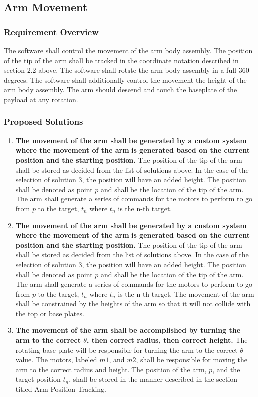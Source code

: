 \documentclass[letterpaper,10pt]{article}
\begin{document}
\subsection{Arm Movement}
\subsubsection{Requirement Overview}
The software shall control the movement of the arm body assembly. 
The position of the tip of the arm shall be tracked in the coordinate notation described in section 2.2 above.
The software shall rotate the arm body assembly in a full 360 degrees.
The software shall additionally control the movement the height of the arm body assembly.
The arm should descend and touch the baseplate of the payload at any rotation.
\subsubsection{Proposed Solutions}
\begin{enumerate}
\item{
\textbf{The movement of the arm shall be generated by a custom system where the movement of the arm is 
generated based on the current position and the starting position.} 
The position of the tip of the arm shall be stored as decided from the list of solutions above. 
In the case of the selection of solution 3, the position will have an added height. 
The position shall be denoted as point \(p\) and shall be the location of the tip of the arm.
The arm shall generate a series of commands for the motors to perform to go from \(p\) to the target, 
\(t_{n}\) where \(t_{n}\) is the n-th target.
}

\item{
\textbf{The movement of the arm shall be generated by a custom system where the movement of the arm is 
generated based on the current position and the starting position.} 
The position of the tip of the arm shall be stored as decided from the list of solutions above. 
In the case of the selection of solution 3, the position will have an added height. 
The position shall be denoted as point \(p\) and shall be the location of the tip of the arm.
The arm shall generate a series of commands for the motors to perform to go from \(p\) to the target, 
\(t_{n}\) where \(t_{n}\) is the n-th target.
The movement of the arm shall be constrained by the heights of the arm so that it will not collide with 
the top or base plates.
}

\item{
\textbf{The movement of the arm shall be accomplished by turning the arm to the correct \(\theta\), then correct radius, then correct height.}
The rotating base plate will be responsible for turning the arm to the correct \(\theta\) value.
The motors, labeled \(m1\), and \(m2\), shall be responsible for moving the arm to the correct radius and
 height. The position of the arm, \(p\), and the target position \(t_{n}\), shall be stored in the 
manner described in the section titled Arm Position Tracking.
}
\end{enumerate}
\end{document}
